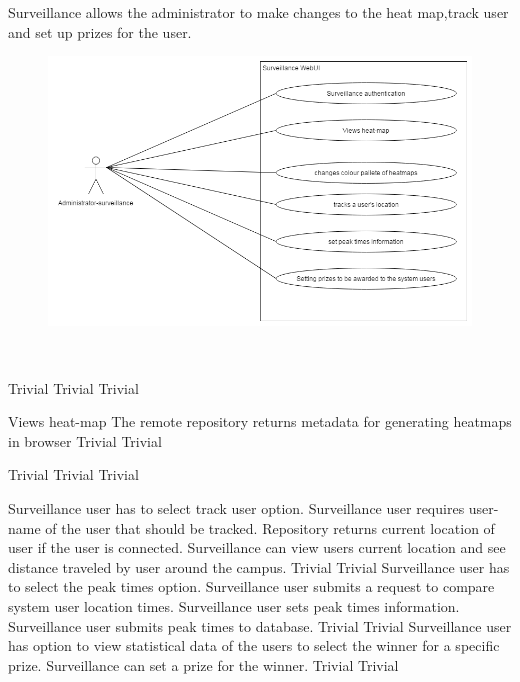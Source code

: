 Surveillance allows the administrator to make changes to the heat map,track user and set up prizes for the user.

\begin{figure}[h]
  \includegraphics[width=\textwidth]{diagrams/Specific_Requirements/surveillance_webUI.png}
\end{figure}
\mbox{}\\
\bigskip

 		{Trivial}
    {Trivial}
    {Trivial}

\FuncReq
    { Views heat-map}
		{The remote repository returns metadata for generating heatmaps in browser}
    {Trivial}
    {Trivial}

		{Trivial}
    {Trivial}
    {Trivial}
	
		{Surveillance user has to select track user option.
		Surveillance user requires user-name of the user that should be tracked.
		Repository returns current location of user if the user is connected.
		Surveillance can view users current location and see distance traveled by user around the campus.}
    {Trivial}
    {Trivial}
		{Surveillance user has to select the peak times option.
		Surveillance user submits a request to compare system user location times.
		Surveillance user sets peak times information.
		Surveillance user submits peak times to database.}
    {Trivial}
    {Trivial}
		{Surveillance user has option to view statistical data of the users to select the winner for a specific prize.
		 Surveillance can set a prize for the winner.}
    {Trivial}
    {Trivial}
